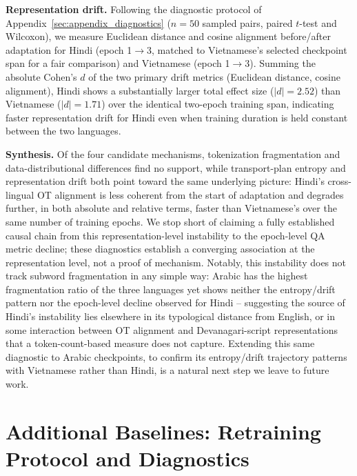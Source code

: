 \documentclass[11pt]{article}
\begin{document}
\textbf{ Representation drift.} Following the diagnostic protocol of Appendix~\ref{sec:appendix_diagnostics} ($n=50$ sampled pairs, paired $t$-test and Wilcoxon), we measure Euclidean distance and cosine alignment before/after adaptation for Hindi (epoch 1$\rightarrow$3, matched to Vietnamese's selected checkpoint span for a fair comparison) and Vietnamese (epoch 1$\rightarrow$3). Summing the absolute Cohen's $d$ of the two primary drift metrics (Euclidean distance, cosine alignment), Hindi shows a substantially larger total effect size ($|d|=2.52$) than Vietnamese ($|d|=1.71$) over the identical two-epoch training span, indicating faster representation drift for Hindi even when training duration is held constant between the two languages.

\textbf{Synthesis.} Of the four candidate mechanisms, tokenization fragmentation and data-distributional differences find no support, while transport-plan entropy and representation drift both point toward the same underlying picture: Hindi's cross-lingual OT alignment is less coherent from the start of adaptation and degrades further, in both absolute and relative terms, faster than Vietnamese's over the same number of training epochs. We stop short of claiming a fully established causal chain from this representation-level instability to the epoch-level QA metric decline; these diagnostics establish a converging association at the representation level, not a proof of mechanism. Notably, this instability does not track subword fragmentation in any simple way: Arabic has the highest fragmentation ratio of the three languages yet shows neither the entropy/drift pattern nor the epoch-level decline observed for Hindi -- suggesting the source of Hindi's instability lies elsewhere in its typological distance from English, or in some interaction between OT alignment and Devanagari-script representations that a token-count-based measure does not capture. Extending this same diagnostic to Arabic checkpoints, to confirm its entropy/drift trajectory patterns with Vietnamese rather than Hindi, is a natural next step we leave to future work.

\section{Additional Baselines: Retraining Protocol and Diagnostics}
\label{sec:appendix_baselines}
\end{document}
